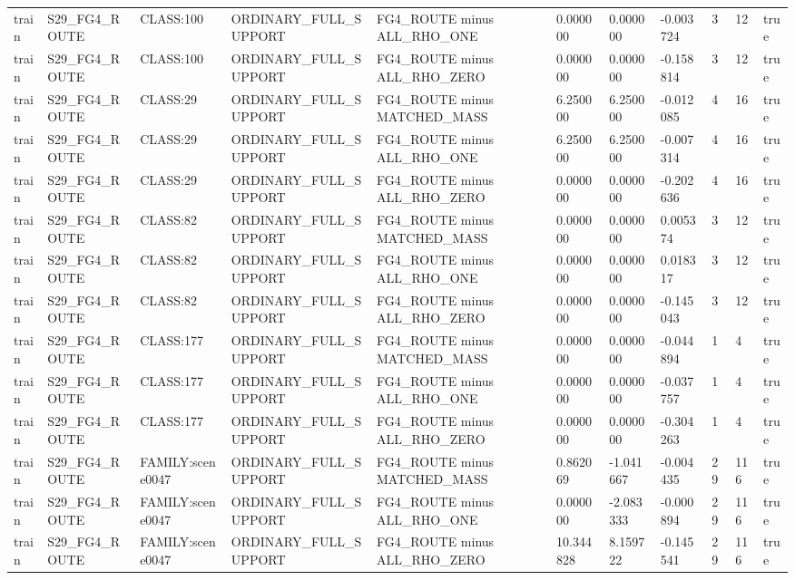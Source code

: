 \begin{tabular}{lllllllllll}
train & S29\_FG4\_ROUTE & CLASS:100 & ORDINARY\_FULL\_SUPPORT & FG4\_ROUTE minus ALL\_RHO\_ONE & 0.000000 & 0.000000 & -0.003724 & 3 & 12 & true \\
train & S29\_FG4\_ROUTE & CLASS:100 & ORDINARY\_FULL\_SUPPORT & FG4\_ROUTE minus ALL\_RHO\_ZERO & 0.000000 & 0.000000 & -0.158814 & 3 & 12 & true \\
train & S29\_FG4\_ROUTE & CLASS:29 & ORDINARY\_FULL\_SUPPORT & FG4\_ROUTE minus MATCHED\_MASS & 6.250000 & 6.250000 & -0.012085 & 4 & 16 & true \\
train & S29\_FG4\_ROUTE & CLASS:29 & ORDINARY\_FULL\_SUPPORT & FG4\_ROUTE minus ALL\_RHO\_ONE & 6.250000 & 6.250000 & -0.007314 & 4 & 16 & true \\
train & S29\_FG4\_ROUTE & CLASS:29 & ORDINARY\_FULL\_SUPPORT & FG4\_ROUTE minus ALL\_RHO\_ZERO & 0.000000 & 0.000000 & -0.202636 & 4 & 16 & true \\
train & S29\_FG4\_ROUTE & CLASS:82 & ORDINARY\_FULL\_SUPPORT & FG4\_ROUTE minus MATCHED\_MASS & 0.000000 & 0.000000 & 0.005374 & 3 & 12 & true \\
train & S29\_FG4\_ROUTE & CLASS:82 & ORDINARY\_FULL\_SUPPORT & FG4\_ROUTE minus ALL\_RHO\_ONE & 0.000000 & 0.000000 & 0.018317 & 3 & 12 & true \\
train & S29\_FG4\_ROUTE & CLASS:82 & ORDINARY\_FULL\_SUPPORT & FG4\_ROUTE minus ALL\_RHO\_ZERO & 0.000000 & 0.000000 & -0.145043 & 3 & 12 & true \\
train & S29\_FG4\_ROUTE & CLASS:177 & ORDINARY\_FULL\_SUPPORT & FG4\_ROUTE minus MATCHED\_MASS & 0.000000 & 0.000000 & -0.044894 & 1 & 4 & true \\
train & S29\_FG4\_ROUTE & CLASS:177 & ORDINARY\_FULL\_SUPPORT & FG4\_ROUTE minus ALL\_RHO\_ONE & 0.000000 & 0.000000 & -0.037757 & 1 & 4 & true \\
train & S29\_FG4\_ROUTE & CLASS:177 & ORDINARY\_FULL\_SUPPORT & FG4\_ROUTE minus ALL\_RHO\_ZERO & 0.000000 & 0.000000 & -0.304263 & 1 & 4 & true \\
train & S29\_FG4\_ROUTE & FAMILY:scene0047 & ORDINARY\_FULL\_SUPPORT & FG4\_ROUTE minus MATCHED\_MASS & 0.862069 & -1.041667 & -0.004435 & 29 & 116 & true \\
train & S29\_FG4\_ROUTE & FAMILY:scene0047 & ORDINARY\_FULL\_SUPPORT & FG4\_ROUTE minus ALL\_RHO\_ONE & 0.000000 & -2.083333 & -0.000894 & 29 & 116 & true \\
train & S29\_FG4\_ROUTE & FAMILY:scene0047 & ORDINARY\_FULL\_SUPPORT & FG4\_ROUTE minus ALL\_RHO\_ZERO & 10.344828 & 8.159722 & -0.145541 & 29 & 116 & true \\

\end{tabular}
